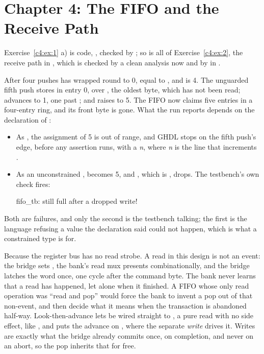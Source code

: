 
\section{Chapter 4: The FIFO and the Receive Path}
\label{sol:c4}
Exercise~\ref{c4:ex:1} a) is code, , checked by ; so is all of
Exercise~\ref{c4:ex:2}, the receive path in , which is checked by a clean analysis
now and by  in .

 After four pushes  has wrapped round to 0, equal to , and
 is 4. The unguarded fifth push stores  in entry 0, over , the
oldest byte, which has not been read; advances  to 1, one past ; and raises
 to 5. The FIFO now claims five entries in a four-entry ring, and its front byte is
gone. What the run reports depends on the declaration of :
\begin{itemize}
  \item As , the assignment of 5 is out of range, and GHDL stops on
    the fifth push's edge, before any assertion runs, with a
    \emph{n}, where \emph{n} is the line that
    increments .
  \item As an unconstrained ,  becomes 5, and , which is
    , drops. The testbench's own check fires:

\begin{console}
fifo_tb: still full after a dropped write!
\end{console}
\end{itemize}
Both are failures, and only the second is the testbench talking; the first is the language refusing
a value the declaration said could not happen, which is what a constrained type is for.

 Because the register bus has no read strobe. A read in this design is not an event: the
bridge sets , the bank's read mux presents  combinationally, and the
bridge latches the word once, one cycle after the command byte. The bank never learns that a read
has happened, let alone when it finished. A FIFO whose only read operation was ``read and pop''
would force the bank to invent a pop out of that non-event, and then decide what it means when the
transaction is abandoned half-way. Look-then-advance lets  be wired straight to
, a pure read with no side effect, like , and puts the advance on ,
where the separate  \emph{write} drives it. Writes are exactly what the bridge already
commits once, on completion, and never on an abort, so the pop inherits that for free.

